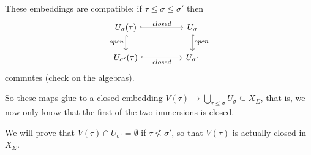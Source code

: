These embeddings are compatible: if $\tau\leq \sigma\leq \sigma'$ then
\[\begin{tikzcd}
	{U_\sigma(\tau)} && {U_\sigma} \\
	{U_{\sigma'}(\tau)} && {U_{\sigma'}}
	\arrow["closed", hook, from=1-1, to=1-3]
	\arrow["open"', hook, from=1-1, to=2-1]
	\arrow["open", hook, from=1-3, to=2-3]
	\arrow["closed"', hook, from=2-1, to=2-3]
\end{tikzcd}\]
commutes (check on the algebras).

So these maps glue to a closed embedding $V(\tau)\to \bigcup_{\tau\leq \sigma}U_\sigma\subseteq X_{\Sigma}$, that is, we now only know that the first of the two immersions is closed.

We will prove that $V(\tau)\cap U_{\sigma'}=\emptyset$ if $\tau\not\leq \sigma'$, so that $V(\tau)$ is actually closed in $X_\Sigma$.





































